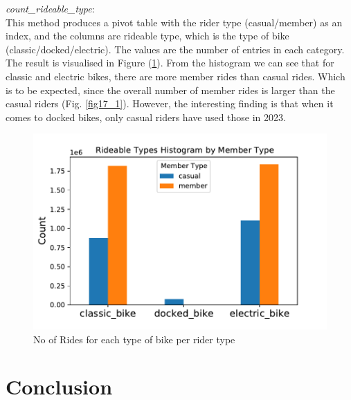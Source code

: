 \documentclass[12pt]{article}
\begin{document}
\textit{count\_rideable\_type}:\\
	This method produces a pivot table with the rider type (casual/member) as an index, and the columns are rideable type, which is the type of bike (classic/docked/electric). The values are the number of entries in each category. The result is visualised in Figure (\ref{fig16}). From the histogram we can see that for classic and electric bikes, there are more member rides than casual rides. Which is to be expected, since the overall number of member rides is larger than the casual riders (Fig. \ref{fig17_1}). However, the interesting finding is that when it comes to docked bikes, only casual riders have used those in 2023.
	
	\begin{figure}[h]
	\centering
	\includegraphics[scale=0.6]{rideable_types.pdf} 
	\caption{No of Rides for each type of bike per rider type}
	\label{fig16}
	\end{figure}
	

\pagebreak

\section{Conclusion}
\end{document}
